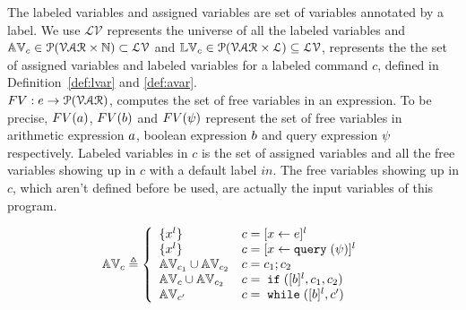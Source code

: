 {%
The labeled variables and assigned variables are set of variables annotated by a label. 
We use  
$\mathcal{LV}$ represents the universe of all the labeled variables and 
$\mathbb{AV}_c \in \mathcal{P}(\mathcal{VAR} \times \mathbb{N}) \subset \mathcal{LV}$ and 
$\mathbb{LV}_c \in \mathcal{P}(\mathcal{VAR} \times \mathcal{L}) \subseteq \mathcal{LV}$,
represents the the set of assigned variables and labeled variables for a labeled command $c$,
defined in Definition~\ref{def:lvar} and \ref{def:avar}.
%
\\
$FV: e \to \mathcal{P}(\mathcal{VAR})$, computes the set of free variables in an expression. To be precise,
$FV(a)$, $FV(b)$ and $FV(\psi)$ represent the set of free variables in arithmetic
expression $a$, boolean expression $b$ and query expression $\psi$ respectively.
Labeled variables in $c$ is the set of assigned variables and all the free variables
showing up in $c$ with a default label $in$. 
The free variables
showing up in $c$, which aren't defined before be used, are actually the input variables of this program.
%
\begin{defn}
\label{def:avar}
{\footnotesize
$$ \avar_{c} \triangleq
  \left\{
  \begin{array}{ll}
      \{{x}^l\}                   
      & {c} = [{\assign x e}]^{l} 
      \\
      \{{x}^l\}                   
      & {c} = [{\assign x \query(\qexpr)}]^{l} 
      \\
      \avar_{{c_1}} \cup \avar_{{c_2}}  
      & {c} = {c_1};{c_2}
      \\
      \avar_{{c}} \cup \avar_{{c_2}} 
      & {c} =\eif([\bexpr]^{l}, c_1, c_2) 
      \\
      \avar_{{c}'}
      & {c}   = \ewhile ([\bexpr]^{l}, {c}')
\end{array}
\right.
$$
}
\end{defn}
%

}
